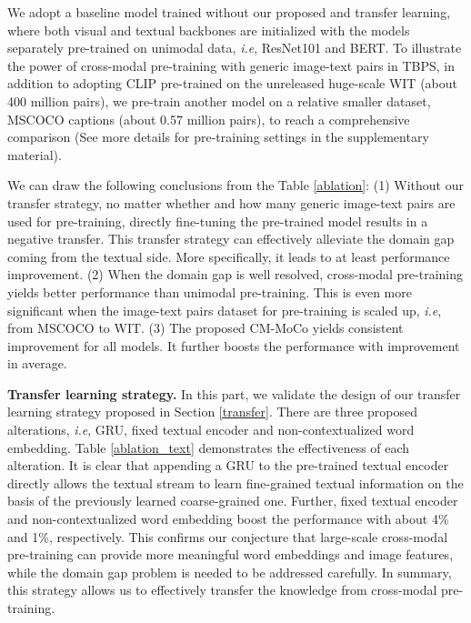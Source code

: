 \documentclass{bmvc2k}
\def\ie{\emph{i.e}\bmvaOneDot}
\newcommand{\revision}[1]{#1}
\newcommand{\statement}[1]{\noindent\textbf{#1}}
\begin{document}
We adopt a baseline model trained without our proposed  and transfer learning, where both visual and textual backbones are initialized with the models separately pre-trained on unimodal data, \ie, ResNet101 and BERT.  
To illustrate the power of cross-modal pre-training with generic image-text pairs in TBPS, in addition to adopting CLIP pre-trained on the unreleased huge-scale WIT \cite{radford2021clip} (about 400 million pairs), we pre-train another model on a relative smaller dataset, MSCOCO captions \cite{lin2014coco} (about 0.57 million pairs), to reach a comprehensive comparison (See more details for pre-training settings in the supplementary material). 

We can draw the following conclusions from the Table \ref{ablation}: 
(1) Without our transfer strategy, no matter whether and how many generic image-text pairs are used for pre-training, directly fine-tuning the pre-trained model results in a negative transfer. \revision{This transfer strategy can effectively alleviate the domain gap coming from the textual side}. More specifically, it leads to at least  performance improvement.
(2) \revision{When the domain gap is well resolved, cross-modal pre-training yields better performance than unimodal pre-training.} This is even more significant when the image-text pairs dataset for pre-training is scaled up, \ie, from MSCOCO to WIT. 
(3) The proposed CM-MoCo yields consistent improvement for all models. It further boosts the performance with  improvement in average. 

\newpage
\statement{Transfer learning strategy.} In this part, we validate the design of our transfer learning strategy proposed in Section \ref{transfer}. 
There are three proposed alterations, \ie, GRU, fixed textual encoder and non-contextualized word embedding. 
Table \ref{ablation_text} demonstrates the effectiveness of each alteration. 
It is clear that appending a GRU to the pre-trained textual encoder directly allows the textual stream to learn fine-grained textual information on the basis of the previously learned coarse-grained one. 
Further, fixed textual encoder and non-contextualized word embedding boost the performance with about 4\% and 1\%, respectively.
\revision{This confirms our conjecture that large-scale cross-modal pre-training can provide more meaningful word embeddings and image features, while the domain gap problem is needed to be addressed carefully.}
In summary, this strategy allows us to effectively transfer the knowledge from cross-modal pre-training. 
\end{document}
